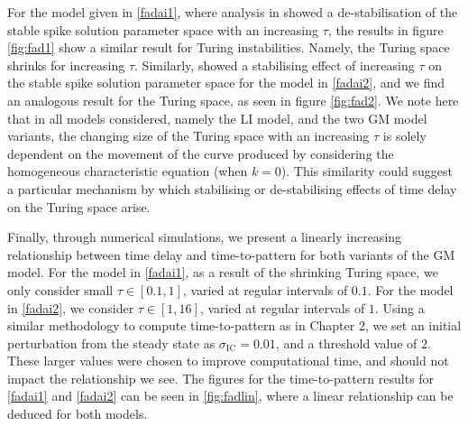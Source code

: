 For the model given in \eqref{fadai1}, where analysis in \cite{fadai1} showed a de-stabilisation of the stable spike solution parameter space with an increasing $\tau$, the results in figure \ref{fig:fad1} show a similar result for Turing instabilities. Namely, the Turing space shrinks for increasing $\tau$. Similarly, \cite{fadai2} showed a stabilising effect of increasing $\tau$ on the stable spike solution parameter space for the model in \eqref{fadai2}, and we find an analogous result for the Turing space, as seen in figure \ref{fig:fad2}. We note here that in all models considered, namely the LI model, and the two GM model variants, the changing size of the Turing space with an increasing $\tau$ is solely dependent on the movement of the curve produced by considering the homogeneous characteristic equation (when $k=0$). This similarity could suggest a particular mechanism by which stabilising or de-stabilising effects of time delay on the Turing space arise.

Finally, through numerical simulations, we present a linearly increasing relationship between time delay and time-to-pattern for both variants of the GM model. For the model in \eqref{fadai1}, as a result of the shrinking Turing space, we only consider small $\tau\in[0.1,1]$, varied at regular intervals of $0.1$. For the model in \eqref{fadai2}, we consider $\tau\in[1,16]$, varied at regular intervals of $1$. Using a similar methodology to compute time-to-pattern as in Chapter 2, we set an initial perturbation from the steady state as $\sigma_{\text{IC}}=0.01$, and a threshold value of $2$. These larger values were chosen to improve computational time, and should not impact the relationship we see. The figures for the time-to-pattern results for \eqref{fadai1} and \eqref{fadai2} can be seen in \ref{fig:fadlin}, where a linear relationship can be deduced for both models.


